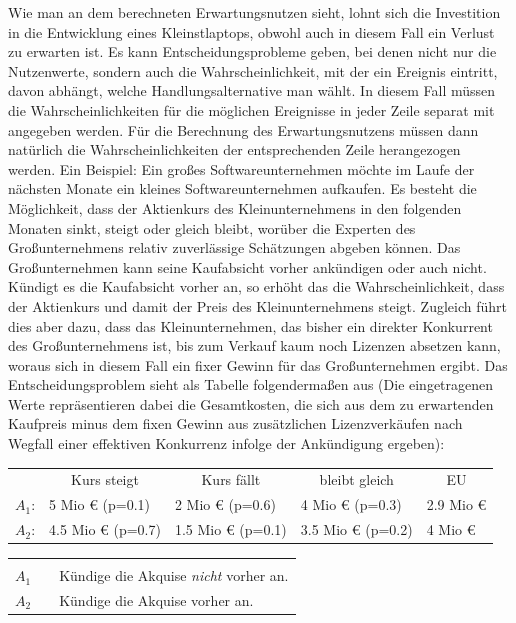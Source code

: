 Wie man an dem berechneten Erwartungsnutzen sieht, lohnt sich 
die Investition in die Entwicklung eines Kleinstlaptops, obwohl auch in diesem
Fall ein Verlust zu erwarten ist. \label{BeispielKausaleEntscheidung} Es kann
Entscheidungsprobleme geben, bei denen nicht nur die Nutzenwerte, 
sondern auch die Wahrscheinlichkeit, mit der
ein Ereignis eintritt, davon abhängt, welche Handlungsalternative man wählt. In
diesem Fall müssen die Wahrscheinlichkeiten für die möglichen Ereignisse in
jeder Zeile separat mit angegeben werden. Für die Berechnung des
Erwartungsnutzens müssen dann natürlich die Wahrscheinlichkeiten der
entsprechenden Zeile herangezogen werden. 
Ein Beispiel: Ein großes Softwareunternehmen
möchte im Laufe der nächsten Monate ein kleines Softwareunternehmen aufkaufen.
Es besteht die Möglichkeit, dass der Aktienkurs des Kleinunternehmens in den
folgenden Monaten sinkt, steigt oder gleich bleibt, worüber die Experten des
Großunternehmens relativ zuverlässige Schätzungen abgeben können. 
Das Großunternehmen kann seine
Kaufabsicht vorher ankündigen oder auch nicht. Kündigt es die Kaufabsicht
vorher an, so erhöht das die Wahrscheinlichkeit, dass der Aktienkurs und damit
der Preis des Kleinunternehmens steigt. Zugleich führt dies aber dazu, dass das
Kleinunternehmen, das bisher ein direkter Konkurrent des Großunternehmens ist,
bis zum Verkauf kaum noch Lizenzen absetzen kann, woraus sich in diesem Fall
ein fixer Gewinn für das Großunternehmen ergibt. Das Entscheidungsproblem sieht
als Tabelle folgendermaßen aus (Die eingetragenen Werte repräsentieren dabei
die Gesamtkosten, die sich aus dem zu erwartenden Kaufpreis minus dem fixen
Gewinn aus zusätzlichen Lizenzverkäufen nach Wegfall einer effektiven
Konkurrenz infolge der Ankündigung ergeben):
\begin{center}
\begin{tabular}{c|l|l|l|l}
\multicolumn{1}{c}{}  & \multicolumn{1}{c}{Kurs steigt}  &
\multicolumn{1}{c}{Kurs fällt} & \multicolumn{1}{c}{bleibt gleich} &
\multicolumn{1}{c}{EU}\\
\cline{2-4} $A_1$: & 5 Mio € {\tiny(p=0.1)}                        
                   & 2 Mio € {\tiny(p=0.6)}
                   & 4 Mio € {\tiny(p=0.3)}
                   & 2.9 Mio €\\ 
                  
\cline{2-4} $A_2$: & 4.5 Mio € {\tiny(p=0.7)}
                   & 1.5 Mio € {\tiny(p=0.1)}
                   & 3.5 Mio € {\tiny(p=0.2)}
                   & 4 Mio €\\
\cline{2-4}
\end{tabular}
\begin{small}
\begin{tabular}{llp{11.5cm}}
& & \\
$A_1$ & & Kündige die Akquise {\em nicht} vorher an.\\
$A_2$ & & Kündige die Akquise vorher an.\\
\end{tabular}
\end{small}
\end{center}

